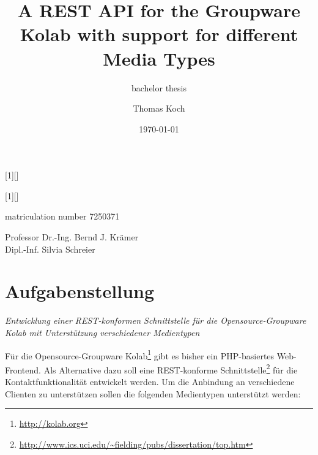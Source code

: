 \documentclass[12pt,a4paper,twoside]{scrartcl}		%
\begin{document}
[1][]
  {\lstset{language=Java,float=tb,#1}}%
  {} %

[1][]
  {\lstset{float=tb,#1}}%
  {} %

\lstset{ %
  language=Java,
  float=tb,
  frame=single,
  captionpos=b
}



\title{A REST API for the Groupware Kolab with support for different Media Types}

\subtitle{bachelor thesis}

\author{Thomas Koch}
\publishers{Fernuniversität Hagen\\Faculty of mathematics and computer science}
\date{\today}

\maketitle{}
\thispagestyle{empty}
\vspace{3cm}
\begin{center}
  matriculation number 7250371
\end{center}
\vspace{3cm}
\begin{center}
Professor Dr.-Ing. Bernd J. Krämer\\
Dipl.-Inf. Silvia Schreier
\end{center}

\section*{Aufgabenstellung}

\textit{Entwicklung einer REST-konformen Schnittstelle für die 
Opensource-Groupware Kolab mit Unterstützung verschiedener Medientypen}

Für die Opensource-Groupware Kolab\footnote{\url{http://kolab.org}} gibt es
bisher ein PHP-basiertes Web-Frontend. Als Alternative dazu soll eine
REST-konforme
Schnittstelle\footnote{\url{http://www.ics.uci.edu/~fielding/pubs/dissertation/top.htm}}
für die Kontaktfunktionalität entwickelt werden. Um die Anbindung an
verschiedene Clienten zu unterstützen sollen die folgenden Medientypen
unterstützt werden:
\end{document}
